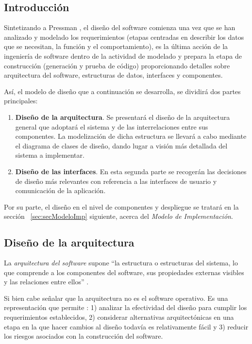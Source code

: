 \subsection{Introducción}

Sintetizando a Pressman \cite{Pre10}, el diseño del software comienza una vez que se han analizado y modelado los requerimientos (etapas centradas en describir los datos que se necesitan, la función y el comportamiento), es la última acción de la ingeniería de software dentro de la actividad de modelado y prepara la etapa de construcción (generación y prueba de código) proporcionando detalles sobre arquitectura del software, estructuras de datos, interfaces y componentes.

Así, el modelo de diseño que a continuación se desarrolla, se dividirá dos partes principales:

\begin{enumerate}
	\item \textbf{Diseño de la arquitectura}. Se presentará el diseño de la arquitectura general que adoptará el sistema y de las interrelaciones entre sus componentes. La modelización de dicha estructura se llevará a cabo mediante el diagrama de clases de diseño, dando lugar a visión más detallada del sistema a implementar.
	\item \textbf{Diseño de las interfaces}. En esta segunda parte se recogerán las decisiones de diseño más relevantes con referencia a las interfaces de usuario y comunicación de la aplicación.
\end{enumerate}

Por su parte, el diseño en el nivel de componentes y despliegue se tratará en la sección ~\ref{sec:secModeloImp} siguiente, acerca del \emph{Modelo de Implementación}.

\subsection{Diseño de la arquitectura}

La \emph{arquitectura del software} supone “la estructura o estructuras del sistema, lo que comprende a los componentes del software, sus propiedades externas visibles y las relaciones entre ellos” \cite{Bas03}.

Si bien cabe señalar que la arquitectura no es el software operativo. Es una representación que permite \cite{Pre10}: 1) analizar la efectividad del diseño para cumplir los requerimientos establecidos, 2) considerar alternativas arquitectónicas en una etapa en la que hacer cambios al diseño todavía es relativamente fácil y 3) reducir los riesgos asociados con la construcción del software.

